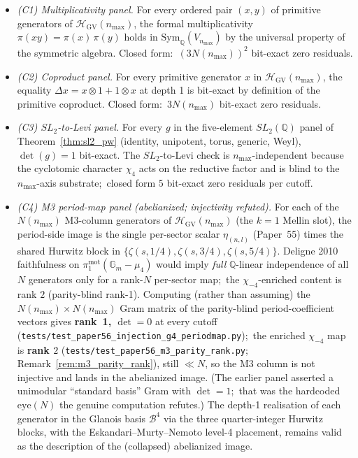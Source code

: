 \documentclass[11pt,a4paper]{article}
\theoremstyle{plain}
\theoremstyle{definition}
\newcommand{\nmax}{n_{\max}}
\newcommand{\HGV}{\mathcal{H}_{\mathrm{GV}}}
\newcommand{\Sym}{\mathrm{Sym}}
\newcommand{\Gm}{\mathbb{G}_{m}}
\newcommand{\Q}{\mathbb{Q}}
\begin{document}
\begin{itemize}
\item \emph{(C1) Multiplicativity panel.} For every ordered pair
$(x, y)$ of primitive generators of $\HGV(\nmax)$, the formal
multiplicativity $\pi(xy) = \pi(x)\,\pi(y)$ holds in
$\Sym_{\Q}(V_{\nmax})$ by the universal property of the symmetric
algebra. Closed form:\ $(3 N(\nmax))^{2}$ bit-exact zero residuals.
\item \emph{(C2) Coproduct panel.} For every primitive generator
$x$ in $\HGV(\nmax)$, the equality $\Delta x = x \otimes 1 + 1
\otimes x$ at depth 1 is bit-exact by definition of the primitive
coproduct. Closed form:\ $3 N(\nmax)$ bit-exact zero residuals.
\item \emph{(C3) $SL_{2}$-to-Levi panel.} For every $g$ in the
five-element $SL_{2}(\Q)$ panel of Theorem~\ref{thm:sl2_pw}
(identity, unipotent, torus, generic, Weyl), $\det(g) = 1$
bit-exact. The $SL_{2}$-to-Levi check is $\nmax$-independent because
the cyclotomic character $\chi_{4}$ acts on the reductive factor
and is blind to the $\nmax$-axis substrate;\ closed form $5$ bit-exact
zero residuals per cutoff.
\item \emph{(C4) M3 period-map panel (abelianized; injectivity
refuted).} For each of the $N(\nmax)$ M3-column generators of
$\HGV(\nmax)$ (the $k = 1$ Mellin slot), the period-side image is the
single per-sector scalar $\eta_{(n,l)}$ (Paper~55) times the shared
Hurwitz block in $\{\zeta(s, 1/4), \zeta(s, 3/4), \zeta(s, 5/4)\}$.
Deligne 2010 faithfulness on
$\pi_{1}^{\mathrm{mot}}(\Gm - \mu_{4})$ would imply \emph{full}
$\Q$-linear independence of all $N$ generators only for a rank-$N$
per-sector map;\ the $\chi_{-4}$-enriched content is rank $2$
(parity-blind rank-1). Computing (rather than assuming) the
$N(\nmax) \times N(\nmax)$ Gram matrix of the parity-blind
period-coefficient vectors gives \textbf{rank~1, $\det = 0$} at every
cutoff (\texttt{tests/test\_paper56\_injection\_g4\_periodmap.py});\ the
enriched $\chi_{-4}$ map is \textbf{rank $2$}
(\texttt{tests/test\_paper56\_m3\_parity\_rank.py};
Remark~\ref{rem:m3_parity_rank}), still $\ll N$, so the M3 column is not
injective and lands in the abelianized image. (The earlier
panel asserted a unimodular ``standard basis'' Gram with $\det = 1$;\
that was the hardcoded $\mathrm{eye}(N)$ the genuine computation
refutes.) The depth-1 realisation of each generator in the Glanois
basis $\mathcal{B}^{4}$ via the three quarter-integer Hurwitz blocks,
with the Eskandari--Murty--Nemoto level-4 placement, remains valid as the
description of the (collapsed) abelianized image.
\end{itemize}
\end{document}
